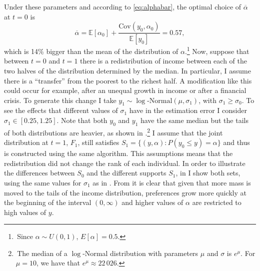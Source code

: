 \documentclass[english, a4paper, 12pt]{article}
\begin{document}
Under these parameters and according to \eqref{eq:alphabar}, the optimal choice of $\overline{\alpha}$ at $t = 0$ is
	\begin{equation} \label{eq:exAlphaBar}
		\overline{\alpha} 
			= \mathbb{E}[\alpha_{0}] + \frac{\mathrm{Cov}(y_{0}, \alpha_{0})}{\mathbb{E}[y_{0}]}
			= 0.57,
	\end{equation}
which is 14\% bigger than the mean of the distribution of $\alpha$.\footnote{\,Since $\alpha \sim U(0,1)$, $E[\alpha] = 0.5$.} Now, suppose that between $t = 0$ and $t = 1$ there is a redistribution of income between each of the two halves of the distribution determined by the median. In particular, I assume there is a ``transfer'' from the poorest to the richest half. A modification like this could occur for example, after an unequal growth in income or after a financial crisis. To generate this change I take $y_{1} \sim \log\text{-Normal}(\mu, \sigma_{1})$, with $\sigma_{1} \geq \sigma_{0}$. To see the effects that different values of $\sigma_{1}$ have in the estimation error I consider $\sigma_{1} \in [0.25, 1.25]$. Note that both $y_{0}$ and $y_{1}$ have the same median but the tails of both distributions are heavier, as shown in .\footnote{\,The median of a $\log$-Normal distribution with parameters $\mu$ and $\sigma$ is $e^{\mu}$. For $\mu = 10$, we have that $e^{\mu} \approx 22\,026$.} I assume that the joint distribution at $t = 1$, $F_{1}$, still satisfies $S_{1} = \{(y,\alpha) : P(y_{0} \leq y) = \alpha\}$ and thus is constructed using the same algorithm. This assumptions means that the redistribution did not change the rank of each individual. In order to illustrate the differences between $S_{0}$ and the different supports $S_{1}$, in  I show both sets, using the same values for $\sigma_{1}$ as in . From  it is clear that given that more mass is moved to the tails of the income distribution, preferences grow more quickly at the beginning of the interval $(0, \infty)$ and higher values of $\alpha$ are restricted to high values of $y$.
\end{document}
